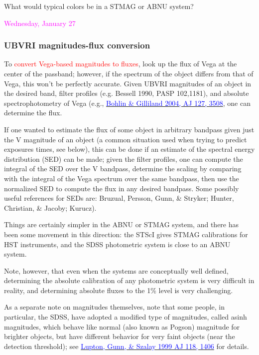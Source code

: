 \documentclass[12pt]{article}
\begin{document}
What would typical colors be in a STMAG or ABNU system?

\textcolor{magenta}{Wednesday, January 27}

\subsubsection*{UBVRI magnitudes-flux conversion
}
To \textcolor{red}{convert Vega-based magnitudes to fluxes},
look up the flux of Vega at the center of the passband;
however, if the spectrum of the object
differs from that of Vega, this won't be perfectly accurate.
Given UBVRI magnitudes of an object in the desired band, filter profiles
(e.g. Bessell 1990, PASP 102,1181), and absolute spectrophotometry of
Vega (e.g., \href{http://adsabs.harvard.edu/abs/2004AJ....127.3508B}
{\textcolor{blue}{Bohlin \& Gilliland 2004, AJ 127, 3508}},
one can determine the flux.

If one wanted to estimate the flux of some object in
arbitrary bandpass given just the V magnitude of an object (a common
situation used when trying to predict exposures times, see below),
this can be done if an estimate of the spectral energy distribution
(SED) can be made; given the filter profiles, one can compute the
integral of the SED over the V bandpass, determine the scaling by
comparing with the integral of the Vega spectrum over the same
bandpass, then use the normalized SED to compute the flux in any
desired bandpass. Some possibly useful references for SEDs are:
Bruzual, Persson, Gunn, \& Stryker; Hunter, Christian, \& Jacoby;
Kurucz).

Things are certainly simpler in the ABNU or STMAG system, and
there has been some movement in this direction: the STScI gives STMAG
calibrations for HST instruments, and the SDSS photometric system is
close to an ABNU system.

Note, however, that even when the systems are conceptually
well defined, determining the absolute calibration of any photometric
system is very difficult in reality, and determining absolute fluxes
to the 1\% level is very challenging.

As a separate note on magnitudes themselves, note that some
people, in particular, the SDSS, have adopted a modified type of
magnitudes, called asinh magnitudes, which behave like normal (also
known as Pogson) magnitude for brighter objects, but have different
behavior for very faint objects (near the detection threshold); see
\href{http://adsabs.harvard.edu/abs/1999AJ....118.1406L}
{\textcolor{blue}{Lupton, Gunn, \& Szalay 1999 AJ 118, 1406}}
for details.
\end{document}
